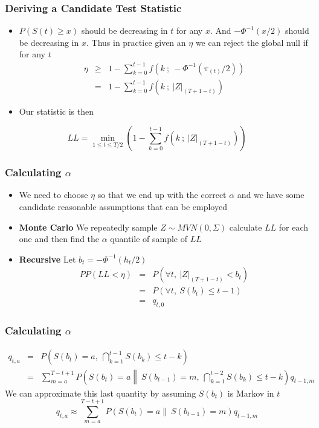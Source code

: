 \documentclass{beamer}
\begin{document}
\begin{frame}
\frametitle{Deriving a Candidate Test Statistic}
\begin{itemize}
\item $P(S(t)\ge x)$ should be decreasing in $t$ for any $x$.  And $-\Phi^{-1}(x/2)$ should be decreasing in $x$.  Thus in practice given an $\eta$ we can reject the global null if for any $t$
\begin{eqnarray*}
\eta&\ge& 1-\sum_{k=0}^{t-1}f\left(k\ ;\ -\Phi^{-1}(\pi_{(t)}/2)\right)\\
&=& 1-\sum_{k=0}^{t-1}f\left(k\ ;\ |Z|_{(T+1-t)}\right)
\end{eqnarray*}
\item Our statistic is then
\end{itemize}
$$LL=\min_{1\le t\le T/2}\left(1-\sum_{k=0}^{t-1}f\left(k\ ;\ |Z|_{(T+1-t)}\right)\right)$$
\end{frame}

\begin{frame}
\frametitle{Calculating $\alpha$}
\begin{itemize}
\item We need to choose $\eta$ so that we end up with the correct $\alpha$ and we have some candidate reasonable assumptions that can be employed
\item \textbf{Monte Carlo} We repeatedly sample $Z\sim MVN(0,\Sigma)$ calculate $LL$ for each one and then find the $\alpha$ quantile of sample of $LL$
\item \textbf{Recursive}  Let $b_t=-\Phi^{-1}\left(h_t/2\right)$
\begin{eqnarray*}
PP(LL<\eta)&=&P\left(\forall t,\ |Z|_{(T+1-t)}<b_t\right)\\
&=&P\left(\forall t,\ S\left(b_t\right)\le t-1\right)\\
&=&q_{t,0}
\end{eqnarray*}
\end{itemize}
\end{frame}

\begin{frame}
\frametitle{Calculating $\alpha$}
\begin{eqnarray*}
q_{t,a}&=&P\left(S\left(b_t\right)=a,\ \bigcap_{k=1}^{t-1}S\left(b_k\right)\le t-k\right)\\
&=&\sum_{m=a}^{T-t+1}P\left(S\left(b_t\right)=a\left\|\ S\left(b_{t-1}\right)=m,\ \bigcap_{k=1}^{t-2}S\left(b_k\right)\le t-k\right.\right)q_{t-1,m}
\end{eqnarray*}
We can approximate this last quantity by assuming $S(b_t)$ is Markov in $t$
$$q_{t,a}\approx\sum_{m=a}^{T-t+1}P\left(S\left(b_t\right)=a\left\|\ S\left(b_{t-1}\right)=m\right.\right)q_{t-1,m}$$
\end{frame}
\end{document}

